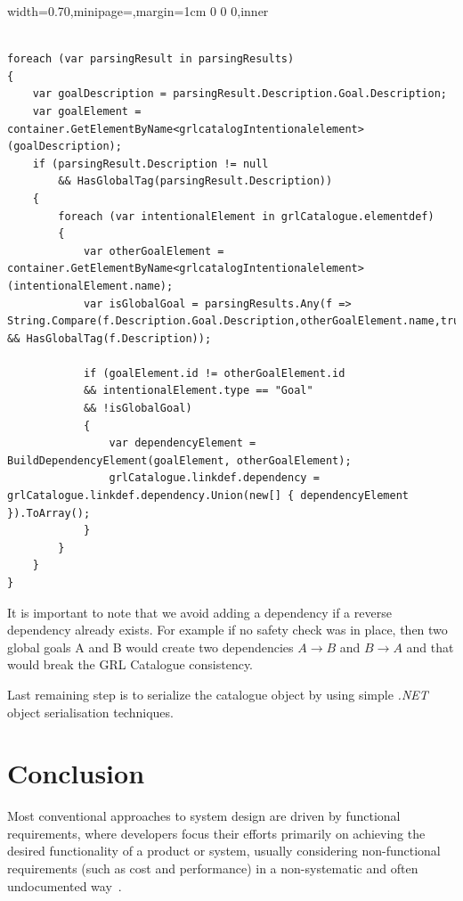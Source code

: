 \documentclass[dissertation,final]{softeng}
\newenvironment{featurecode}[1]
{ \lrbox\featurebox \begin{adjustbox}{width=#1\textwidth,minipage=\textwidth,margin=1cm 0 0 0,inner} }
{ \end{adjustbox}\endlrbox}
\newenvironment{featurelist}[2]
{
\newcommand{\setcaption}{\caption{#1}}
\newcommand{\setlabel}{\label{#2}}
}
{\begin{listing}[h!]\centering\usebox\featurebox\setcaption\setlabel\end{listing}}
\begin{document}
\begin{featurelist}{Translator to GRL -- Add global goals}{lst:translator_to_grl_global_goals}
\begin{featurecode}{0.70}
\begin{verbatim}

foreach (var parsingResult in parsingResults)
{
    var goalDescription = parsingResult.Description.Goal.Description;
    var goalElement = container.GetElementByName<grlcatalogIntentionalelement>(goalDescription);
    if (parsingResult.Description != null 
        && HasGlobalTag(parsingResult.Description))
    {
        foreach (var intentionalElement in grlCatalogue.elementdef)
        {
            var otherGoalElement = container.GetElementByName<grlcatalogIntentionalelement>(intentionalElement.name);
            var isGlobalGoal = parsingResults.Any(f => String.Compare(f.Description.Goal.Description,otherGoalElement.name,true)==0 && HasGlobalTag(f.Description));
        
            if (goalElement.id != otherGoalElement.id 
            && intentionalElement.type == "Goal" 
            && !isGlobalGoal)
            {
                var dependencyElement = BuildDependencyElement(goalElement, otherGoalElement);
                grlCatalogue.linkdef.dependency = grlCatalogue.linkdef.dependency.Union(new[] { dependencyElement }).ToArray();
            }
        }
    }
}
\end{verbatim}
\end{featurecode}
\end{featurelist}
It is important to note that we avoid adding a dependency if a reverse dependency already exists. For example if no safety check was in place, then two global goals A and B would create two dependencies $A \rightarrow B$ and $B \rightarrow A$ and that would break the GRL Catalogue consistency.

Last remaining step is to serialize the catalogue object by using simple \emph{.NET} object serialisation techniques.

\chapter{Conclusion}
\label{ch:Conclusion}
Most conventional approaches to system design are driven by functional requirements, where developers focus their efforts primarily on achieving the desired functionality of a product or system, usually considering non-functional requirements (such as cost and performance) in a non-systematic and often undocumented way~\citep{Chung2000}.
\end{document}
